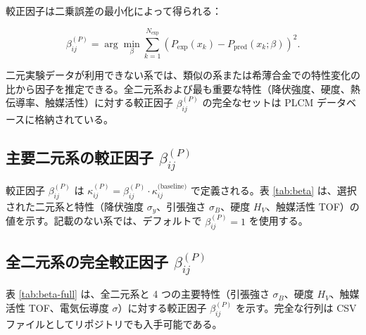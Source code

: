 \documentclass[11pt,a4paper]{article}
\theoremstyle{remark}
\begin{document}
	較正因子は二乗誤差の最小化によって得られる：
	
	\begin{equation}
		\beta_{ij}^{(P)} = \arg\min_{\beta} \sum_{k=1}^{N_{\text{exp}}} \left( P_{\text{exp}}(x_k) - P_{\text{pred}}(x_k;\beta) \right)^2.
		\label{eq:beta-optimization}
	\end{equation}
	
	二元実験データが利用できない系では、類似の系または希薄合金での特性変化の比から因子を推定できる。全二元系および最も重要な特性（降伏強度、硬度、熱伝導率、触媒活性）に対する較正因子 \(\beta_{ij}^{(P)}\) の完全なセットは PLCM データベースに格納されている。
	
	\subsection{主要二元系の較正因子 \(\beta_{ij}^{(P)}\)}
	\label{subsec:beta-table}
	
	較正因子 \(\beta_{ij}^{(P)}\) は \(\kappa_{ij}^{(P)} = \beta_{ij}^{(P)} \cdot \kappa_{ij}^{\text{(baseline)}}\) で定義される。表 \ref{tab:beta} は、選択された二元系と特性（降伏強度 \(\sigma_y\)、引張強さ \(\sigma_B\)、硬度 \(H_V\)、触媒活性 TOF）の値を示す。記載のない系では、デフォルトで \(\beta_{ij}^{(P)} = 1\) を使用する。
	
	\subsection{全二元系の完全較正因子 \(\beta_{ij}^{(P)}\)}
	\label{subsec:beta-full}
	
	表 \ref{tab:beta-full} は、全二元系と 4 つの主要特性（引張強さ \(\sigma_B\)、硬度 \(H_V\)、触媒活性 TOF、電気伝導度 \(\sigma\)）に対する較正因子 \(\beta_{ij}^{(P)}\) を示す。完全な行列は CSV ファイルとしてリポジトリでも入手可能である。
	
\end{document}
